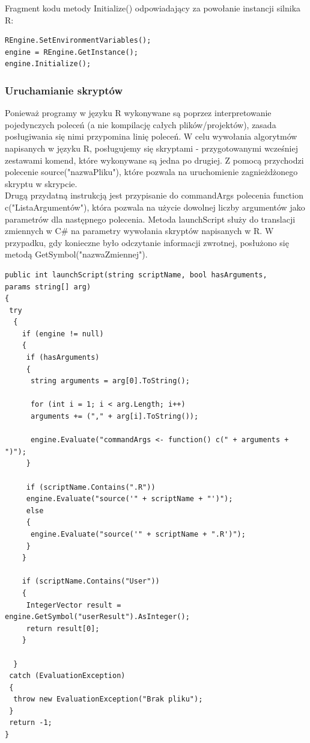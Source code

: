 \documentclass[a4paper,twoside]{article}
\begin{document}
\newpage

Fragment kodu metody Initialize() odpowiadający za powołanie instancji silnika R:
\lstset{style=sharpc}
\begin{lstlisting}[language=CSharp]
REngine.SetEnvironmentVariables();
engine = REngine.GetInstance();
engine.Initialize();
\end{lstlisting}

\subsubsection{Uruchamianie skryptów}

Ponieważ programy w języku R wykonywane są poprzez interpretowanie pojedynczych poleceń (a nie kompilację całych plików/projektów), zasada posługiwania się nimi przypomina linię poleceń. W celu wywołania algorytmów napisanych w języku R, posługujemy się skryptami - przygotowanymi wcześniej zestawami komend, które wykonywane są jedna po drugiej. Z pomocą przychodzi polecenie source("nazwaPliku"), które pozwala na uruchomienie zagnieżdżonego skryptu w skrypcie. \\

Drugą przydatną instrukcją jest przypisanie do commandArgs polecenia function c("ListaArgumentów"), która pozwala na użycie dowolnej liczby argumentów jako parametrów dla następnego polecenia. Metoda launchScript służy do translacji zmiennych w C\# na parametry wywołania skryptów napisanych w R. W przypadku, gdy konieczne było odczytanie informacji zwrotnej, posłużono się metodą GetSymbol("nazwaZmiennej").

\lstset{style=sharpc}
\begin{lstlisting}
public int launchScript(string scriptName, bool hasArguments,
params string[] arg)
{
 try
  {
    if (engine != null)
    {
     if (hasArguments)
     {
      string arguments = arg[0].ToString();

      for (int i = 1; i < arg.Length; i++)
      arguments += ("," + arg[i].ToString());

      engine.Evaluate("commandArgs <- function() c(" + arguments + ")");                        
     }

     if (scriptName.Contains(".R"))
     engine.Evaluate("source('" + scriptName + "')");
     else
     {
      engine.Evaluate("source('" + scriptName + ".R')");
     }
    }

    if (scriptName.Contains("User"))
    {
     IntegerVector result = engine.GetSymbol("userResult").AsInteger();
     return result[0];
    }

  }
 catch (EvaluationException)
 {
  throw new EvaluationException("Brak pliku");
 }
 return -1;
}
\end{lstlisting}
\end{document}
